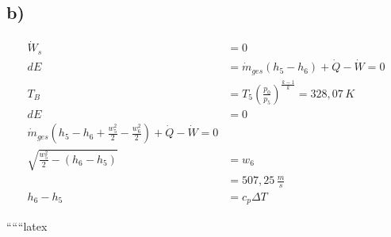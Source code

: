 

\subsection*{b)}

\begin{align*}
\dot{W}_s &= 0 \\
dE &= \dot{m}_{ges}(h_5 - h_6) + \dot{Q} - \dot{W} = 0 \\
T_B &= T_5 \left(\frac{p_0}{p_5}\right)^{\frac{k-1}{k}} = 328{,}07\,K \\
dE &= 0 \\
\dot{m}_{ges}(h_5 - h_6 + \frac{w_5^2}{2} - \frac{w_6^2}{2}) + \dot{Q} - \dot{W} = 0 \\
\sqrt{\frac{w_5^2}{2} - (h_6 - h_5)} &= w_6 \\
&= 507{,}25\,\frac{m}{s} \\
h_6 - h_5 &= c_p \Delta T
\end{align*}

``````latex
